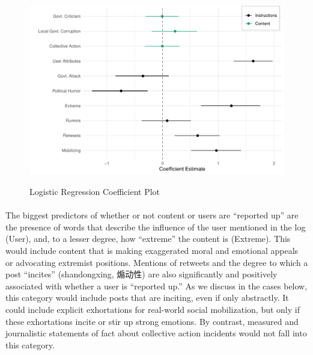 \documentclass[12pt]{article}
\begin{document}
\begin{CJK*}{UTF8}{gbsn}
{
\begin{figure}[H]
	\centering
	\caption{Logistic Regression Coefficient Plot}
	\includegraphics[width=\textwidth]{figures/coef_plot.pdf}\\
	\label{coef_plot}
\end{figure}
}

\paragraph{} The biggest predictors of whether or not content or users are ``reported up'' are the presence of words that describe the influence of the user mentioned in the log (User), and, to a lesser degree, how ``extreme'' the content is (Extreme). This would include content that is making exaggerated moral and emotional appeals or advocating extremist positions. Mentions of retweets and the degree to which a post ``incites'' (shandongxing, 煽动性) are also significantly and positively associated with whether a user is ``reported up.'' As we discuss in the cases below, this category would include posts that are inciting, even if only abstractly. It could include explicit exhortations for real-world social mobilization, but only if these exhortations incite or stir up strong emotions. By contrast, measured and journalistic statements of fact about collective action incidents would not fall into this category.


\end{CJK*}
\end{document}
